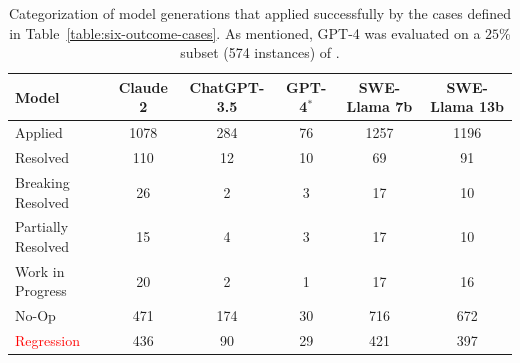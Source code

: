 \begin{table}[ht]
    \centering
    \begin{tabular}{l|ccccc}
    \toprule
Model & Claude 2 & ChatGPT-3.5 & GPT-4$^*$ & SWE-Llama 7b & SWE-Llama 13b \\
    \midrule
Applied & 1078 & 284 & 76 & 1257 & 1196 \\
    \midrule
\textcolor{green1}{Resolved} & 110 & 12 & 10 & 69 & 91 \\
\textcolor{green2}{Breaking Resolved} & 26 & 2 & 3 & 17 & 10 \\
\textcolor{green3}{Partially Resolved} & 15 & 4 & 3 & 17 & 10 \\
\textcolor{green4}{Work in Progress} & 20 & 2 & 1 & 17 & 16 \\
No-Op & 471 & 174 & 30 & 716 & 672 \\
\textcolor{red}{Regression} & 436 & 90 & 29 & 421 & 397 \\
    \bottomrule
    \end{tabular}
    \caption{Categorization of model generations that applied successfully by the cases defined in Table~\ref{table:six-outcome-cases}. As mentioned, GPT-4 was evaluated on a $25$\% subset (574 instances) of \benchmark{}.}
    \label{table:six-outcome-stats}
\end{table}